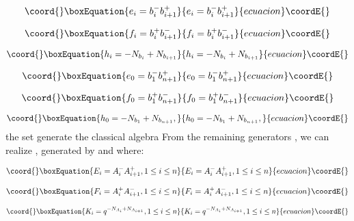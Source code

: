 \documentclass[a4paper,12pt,thmsa]{article}
\begin{document}
\begin{equation}\coord{}\boxEquation{
e_i=b_i^{-}b_{i+1}^{+}
}{
e_i=b_i^{-}b_{i+1}^{+}
}{ecuacion}\coordE{}\end{equation}

\begin{equation}\coord{}\boxEquation{
f_i=b_i^{+}b_{i+1}^{-}
}{
f_i=b_i^{+}b_{i+1}^{-}
}{ecuacion}\coordE{}\end{equation}

\begin{equation}\coord{}\boxEquation{
h_i=-N_{b_i}+N_{b_{i+1}}
}{
h_i=-N_{b_i}+N_{b_{i+1}}
}{ecuacion}\coordE{}\end{equation}

\begin{equation}\coord{}\boxEquation{
e_0=b_1^{-}b_{n+1}^{+}
}{
e_0=b_1^{-}b_{n+1}^{+}
}{ecuacion}\coordE{}\end{equation}

\begin{equation}\coord{}\boxEquation{
f_0=b_1^{+}b_{n+1}^{-}
}{
f_0=b_1^{+}b_{n+1}^{-}
}{ecuacion}\coordE{}\end{equation}

\begin{equation}\coord{}\boxEquation{
h_0=-N_{b_1}+N_{b_{n+1}},
}{
h_0=-N_{b_1}+N_{b_{n+1}},
}{ecuacion}\coordE{}\end{equation}
the set \coordHE{} generate the classical algebra \coordHE{} From the remaining generators \coordHE{}  \coordHE{}, we can realize \coordHE{}, generated by \coordHE{}  \coordHE{}  \coordHE{} and \coordHE{} where:

\begin{equation}\coord{}\boxEquation{
E_i=A_i^{-}A_{i+1}^{+},1\leq i\leq n
}{
E_i=A_i^{-}A_{i+1}^{+},1\leq i\leq n
}{ecuacion}\coordE{}\end{equation}

\begin{equation}\coord{}\boxEquation{
F_i=A_i^{+}A_{i+1}^{-},1\leq i\leq n
}{
F_i=A_i^{+}A_{i+1}^{-},1\leq i\leq n
}{ecuacion}\coordE{}\end{equation}

\begin{equation}\coord{}\boxEquation{
K_i=q^{-N_{A_i}+N_{A_{i+1}}},1\leq i\leq n
}{
K_i=q^{-N_{A_i}+N_{A_{i+1}}},1\leq i\leq n
}{ecuacion}\coordE{}\end{equation}
\end{document}

